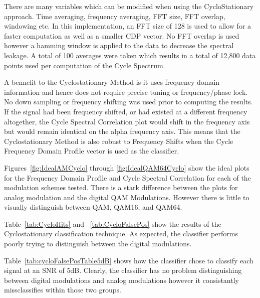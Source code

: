 There are many variables which can be modified when using the CycloStationary
approach.  Time averaging, frequency averaging, FFT size, FFT overlap, windowing
etc.  In this implementation, an FFT size of 128 is used to allow for a faster
computation as well as a smaller CDP vector.  No FFT overlap is used however a
hamming window is applied to the data to decrease the spectral leakage.  A total
of 100 averages were taken which results in a total of 12,800 data points used
per computation of the Cycle Spectrum.

A bennefit to the Cyclostationary Method is it uses frequency domain information
and hence does not require precise tuning or frequency/phase lock.  No down
sampling or frequency shifting was used prior to computing the results.  If the
signal had been frequency shifted, or had existed at a different frequency
altogether, the Cycle Spectral Correlation plot would shift in the frequency
axis but would remain identical on the alpha frequency axis.  This means that
the Cyclostationary Method is also robust to Frequency Shifts when the Cycle
Frequency Domain Profile vector is used as the classifier.

Figures~\ref{fig:IdealAMCyclo} through \ref{fig:IdealQAM64Cyclo} show the
ideal plots for the Frequency Domain Profile and Cycle Spectral Correlation for
each of the modulation schemes tested.  There is a stark difference between the
plots for analog modulation and the digital QAM Modulations.  However there is 
little to visually distinguish between QAM, QAM16, and QAM64.  

Table~\ref{tab:CycloHits} and ~\ref{tab:CycloFalsePos} show the results of the
Cyclostationary classification technique.  As expected, the classifier performs
poorly trying to distinguish between the digital modulations.

Table~\ref{tab:cycloFalsePosTable5dB} shows how the classifier chose to classify
each signal at an SNR of 5dB.  Clearly, the classifier has no problem
distinguishing between digital modulations and analog modulations however it
consistantly missclassifies within those two groups.  


